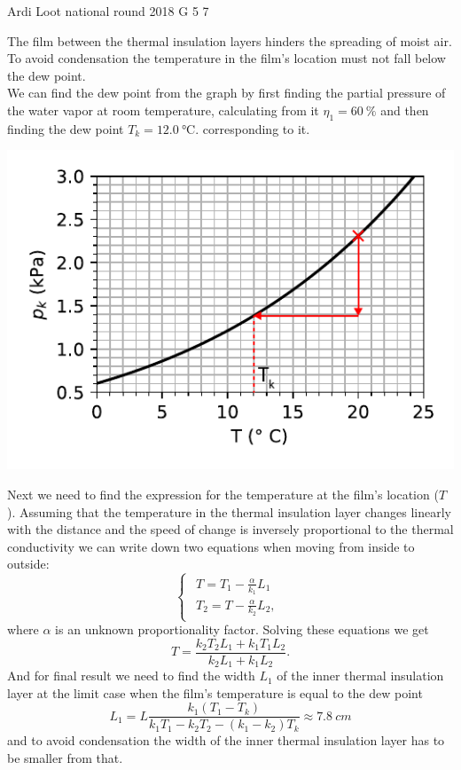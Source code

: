 \documentclass[11pt]{article}
\begin{document}
{Ardi Loot} %
{national round} %
{2018} %
{G 5} %
{7} %
{

\ifEngSolution
The film between the thermal insulation layers hinders the spreading of moist air. To avoid condensation the temperature in the film’s location must not fall below the dew point.\\
We can find the dew point from the graph by first finding the partial pressure of the water vapor at room temperature, calculating from it $\eta_{1}=\SI{60}{\percent}$ and then finding the dew point $T_{k}=\SI{12.0}{\celsius}.$ corresponding to it.
\begin{center}
\includegraphics[scale=0.9]{2018-v3g-05-kullastunud-aur-lah}
\par\end{center}
Next we need to find the expression for the temperature at the film’s location ($T$). Assuming that the temperature in the thermal insulation layer changes linearly with the distance and the speed of change is inversely proportional to the thermal conductivity we can write down two equations when moving from inside to outside:
\begin{equation*}
\begin{cases}
\begin{array}{c}
T=T_{1}-\frac{\alpha}{k_{1}}L_{1}\\
T_{2}=T-\frac{\alpha}{k_{2}}L_{2},
\end{array}
\end{cases}
\end{equation*}
where $\alpha$ is an unknown proportionality factor. Solving these equations we get
\begin{equation*}
T=\frac{k_{2}T_{2}L_{1}+k_{1}T_{1}L_{2}}{k_{2}L_{1}+k_{1}L_{2}}.
\end{equation*}
And for final result we need to find the width $L_{1}$ of the inner thermal insulation layer at the limit case when the film’s temperature is equal to the dew point
\begin{equation*}
L_{1}=L\frac{k_{1}\left(T_{1}-T_{k}\right)}{k_{1}T_{1}-k_{2}T_{2}-\left(k_{1}-k_{2}\right)T_{k}}\approx\SI{7.8}{cm}
\end{equation*}
and to avoid condensation the width of the inner thermal insulation layer has to be smaller from that.
\fi
}
\end{document}
